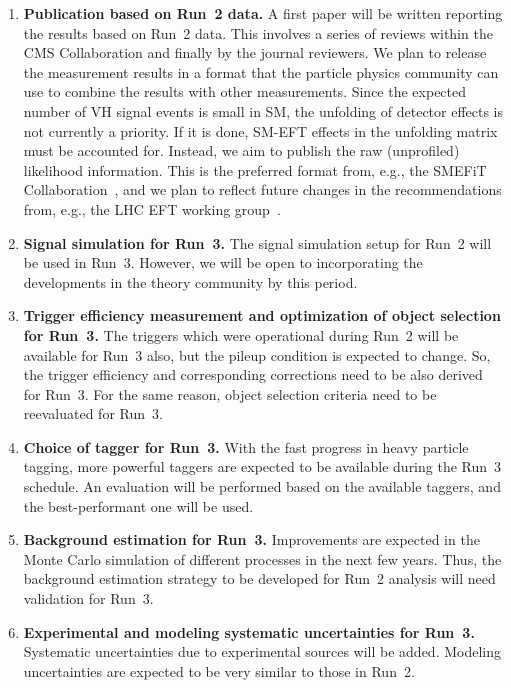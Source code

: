 \documentclass[a4paper,11pt]{article}
\begin{document}
\begin{enumerate}[noitemsep,topsep=0pt]
\item {\bf Publication based on Run~2 data.} A first paper will be written reporting the results based on Run~2 data. This involves a series of reviews within the CMS Collaboration and finally by the journal reviewers. 
We plan to release the measurement results in a format that the particle physics community can use to combine the results with other measurements. Since the expected number of VH signal events is small in SM, the unfolding of detector effects is not currently a priority. If it is done, SM-EFT effects in the unfolding matrix must be accounted for. Instead, we aim to publish the raw (unprofiled) likelihood information. This is the preferred format from, e.g., the SMEFiT Collaboration~\cite{SMEFTFiT}, and we plan to reflect future changes in the recommendations from, e.g., the LHC EFT working group~\cite{LHC_EFT_WG}.

\item {\bf Signal simulation for Run~3.} The signal simulation setup for Run~2 will be used in Run~3. However, we will be open to incorporating the developments in the theory community by this period. 

\item {\bf Trigger efficiency measurement and optimization of object selection for Run~3.} The triggers which were operational during Run~2 will be available for Run~3 also, but the pileup condition is expected to change. So, the trigger efficiency and corresponding corrections need to be also derived for Run~3. 
For the same reason, object selection criteria need to be reevaluated for Run~3. 

\item {\bf Choice of \PH tagger for Run~3.} With the fast progress in heavy particle tagging, more powerful taggers are expected to be available during the Run~3 schedule. An evaluation will be performed based on the available taggers, and the best-performant one will be used. 

\item {\bf Background estimation for Run~3.} Improvements are expected in the Monte Carlo simulation of different processes in the next few years. Thus, the background estimation strategy to be developed for Run~2 analysis will need validation for Run~3.

\item {\bf Experimental and modeling systematic uncertainties for Run~3.} Systematic uncertainties due to experimental sources will be added. Modeling uncertainties are expected to be very similar to those in Run~2.


\end{enumerate}
\end{document}
